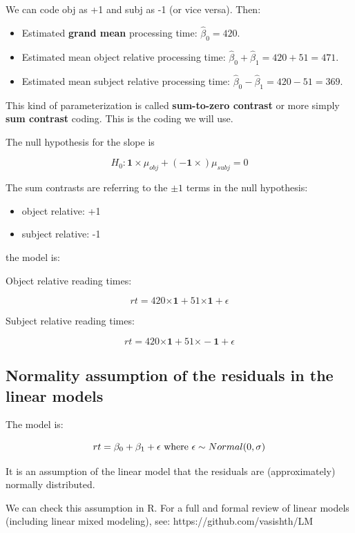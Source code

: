 \documentclass[12pt]{article}
\begin{document}
We can code obj as +1 and subj as -1 (or vice versa). Then:

\begin{itemize}
\item
Estimated \textbf{grand mean} processing time: $\hat \beta_0=420$.
\item
Estimated mean object relative processing time: $\hat\beta_0+\hat\beta_1=420+51=471$.
\item
Estimated mean subject relative processing time: $\hat\beta_0-\hat\beta_1=420-51=369$.
\end{itemize}

This kind of parameterization is called \textbf{sum-to-zero contrast} or more simply \textbf{sum contrast} coding. This is the coding we will use.

The null hypothesis for the slope is

\begin{equation}
H_0: \mathbf{1\times} \mu_{obj} + (\mathbf{-1\times}) \mu_{subj} = 0   
\end{equation}

The sum contrasts are referring to the $\pm 1$ terms in the null hypothesis:

\begin{itemize}
\item object relative: +1
\item subject relative: -1
\end{itemize}

the model is:

Object relative reading times:

\begin{equation}
rt = 420\mathbf{\times 1} + 51\mathbf{\times 1} + \epsilon
\end{equation}

Subject relative reading times:

\begin{equation}
rt = 420\mathbf{\times 1} + 51\mathbf{\times -1} + \epsilon
\end{equation}

\subsection{Normality assumption of the residuals in the linear models}

The model is:

\begin{equation}
rt = \beta_0 + \beta_1 + \epsilon \hbox{ where }  \epsilon\sim Normal(0,\sigma)
\end{equation}

It is an assumption of the linear model that the residuals are (approximately) normally distributed.

We can check this assumption in R. For a full and formal review of linear models (including linear mixed modeling), see: https://github.com/vasishth/LM
\end{document}
